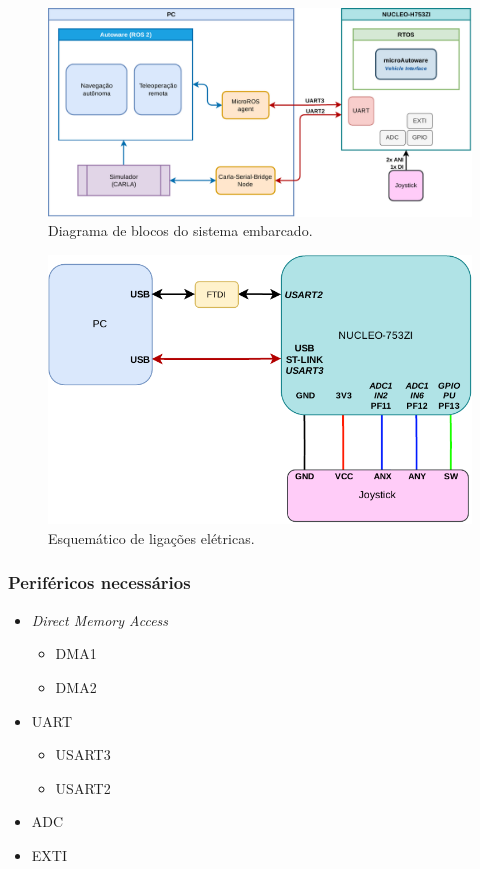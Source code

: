 \begin{figure}[H]
	\centering
	\includegraphics[width=0.75\linewidth]{img/block_diagram.pdf}
	\caption{Diagrama de blocos do sistema embarcado.}
	\label{fig:blockdiagram}
\end{figure}

\begin{figure}[H]
	\centering
	\includegraphics[width=0.6\linewidth]{img/esquematico.pdf}
	\caption{Esquemático de ligações elétricas.}
	\label{fig:esquematico}
\end{figure}

\subsubsection*{Periféricos necessários}

\begin{itemize}
	\item \textit{Direct Memory Access}
	\begin{itemize}
		\item DMA1
		
		\item DMA2		
	\end{itemize}
	
	\item UART
	\begin{itemize}
		\item USART3
		
		\item USART2
		
	\end{itemize}
	
	\item ADC
	
	\item EXTI
	
	
	
\end{itemize}


